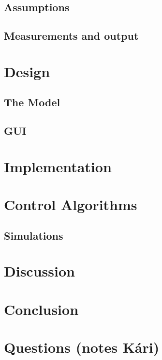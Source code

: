 \documentclass[A4,openany,12pt]{article}
\begin{document}
\subsection{Assumptions}



\subsection{Measurements and output}


\section{Design}
\subsection{The Model}

\subsection{GUI}


\section{Implementation}




\section{Control Algorithms}
\subsection{Simulations}





\section{Discussion}



\section{Conclusion}
%

\section{Questions (notes K\'ari)}





\pagebreak
\printnomenclature
\nocite{*}
{} 

\end{document}

